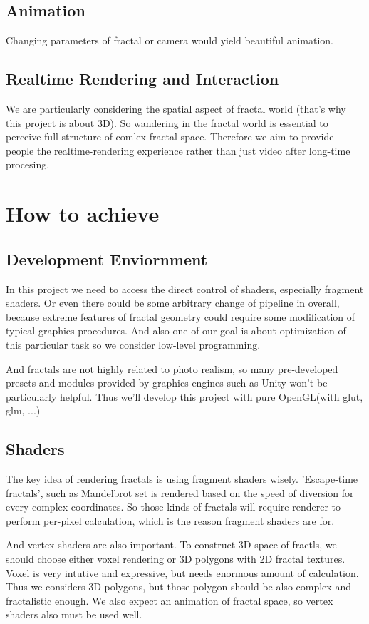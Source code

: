 \documentclass[a4paper]{article}
\begin{document}
\subsection{Animation}
Changing parameters of fractal or camera would yield beautiful animation.
\subsection{Realtime Rendering and Interaction}
We are particularly considering the spatial aspect of fractal world (that's why this project is about 3D).
So wandering in the fractal world is essential to perceive full structure of comlex fractal space.
Therefore we aim to provide people the realtime-rendering experience rather than just video after long-time procesing.
\section{How to achieve}
\subsection{Development Enviornment}
In this project we need to access the direct control of shaders, especially fragment shaders.
Or even there could be some arbitrary change of pipeline in overall, because extreme features of fractal geometry could require some modification of typical graphics procedures.
And also one of our goal is about optimization of this particular task so we consider low-level programming.

And fractals are not highly related to photo realism, so many pre-developed presets and modules provided by
graphics engines such as Unity won't be particularly helpful.
Thus we'll develop this project with pure OpenGL(with glut, glm, ...)
\subsection{Shaders}
The key idea of rendering fractals is using fragment shaders wisely.
'Escape-time fractals', such as Mandelbrot set is rendered based on the speed of diversion for every complex coordinates.
So those kinds of fractals will require renderer to perform per-pixel calculation, which is the reason fragment shaders are for.

And vertex shaders are also important.
To construct 3D space of fractls, we should choose either voxel rendering or 3D polygons with 2D fractal textures.
Voxel is very intutive and expressive, but needs enormous amount of calculation.
Thus we considers 3D polygons, but those polygon should be also complex and fractalistic enough.
We also expect an animation of fractal space, so vertex shaders also must be used well.
\end{document}
